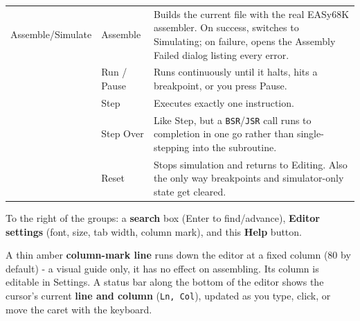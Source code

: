 \begin{longtable}{@{}p{3.0cm}p{3.4cm}p{7.8cm}@{}}
Assemble/Simulate & Assemble & Builds the current file with the real EASy68K assembler. On success, switches to Simulating; on failure, opens the Assembly Failed dialog listing every error. \\
 & Run / Pause & Runs continuously until it halts, hits a breakpoint, or you press Pause. \\
 & Step & Executes exactly one instruction. \\
 & Step Over & Like Step, but a \texttt{BSR}/\texttt{JSR} call runs to completion in one go rather than single-stepping into the subroutine. \\
 & Reset & Stops simulation and returns to Editing. Also the only way breakpoints and simulator-only state get cleared. \\
\bottomrule
\end{longtable}
To the right of the groups: a \textbf{search} box (Enter to find/advance), \textbf{Editor settings} (font, size, tab width, column mark), and this \textbf{Help} button.

A thin amber \textbf{column-mark line} runs down the editor at a fixed column (80 by default) - a visual guide only, it has no effect on assembling. Its column is editable in Settings. A status bar along the bottom of the editor shows the cursor's current \textbf{line and column} (\texttt{Ln, Col}), updated as you type, click, or move the caret with the keyboard.
